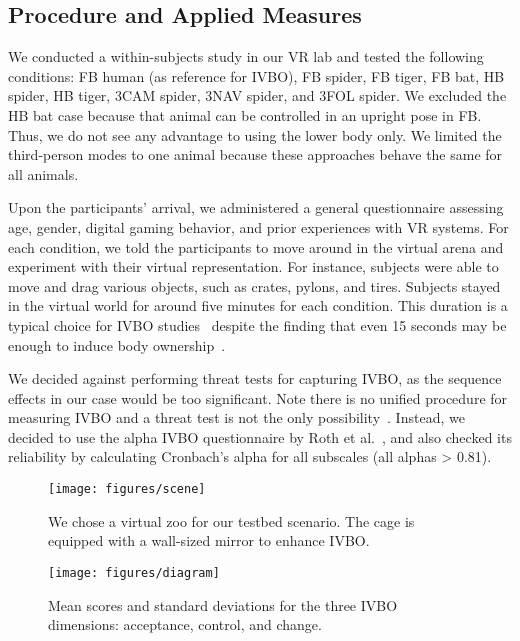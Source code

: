 \subsection{Procedure and Applied Measures}


We conducted a within-subjects study in our VR lab and tested the following conditions: FB human (as reference for IVBO), FB spider, FB tiger, FB bat, HB spider, HB tiger, 3CAM spider, 3NAV spider, and 3FOL spider. We excluded the HB bat case because that animal can be controlled in an upright pose in FB. Thus, we do not see any advantage to using the lower body only. We limited the third-person modes to one animal because these approaches behave the same for all animals.




Upon the participants' arrival, we administered a general questionnaire assessing age, gender, digital gaming behavior, and prior experiences with VR systems. For each condition, we told the participants to move around in the virtual arena and experiment with their virtual representation. For instance, subjects were able to move and drag various objects, such as crates, pylons, and tires. Subjects stayed in the virtual world for around five minutes for each condition. This duration is a typical choice for IVBO studies~\cite{tsakiris2005rubber} despite the finding that even 15 seconds may be enough to induce body ownership~\cite{lloyd2007spatial}. 

We decided against performing threat tests for capturing IVBO, as the sequence effects in our case would be too significant. Note there is no unified procedure for measuring IVBO and a threat test is not the only possibility~\cite{kilteni2012sense,roth2017alpha}. Instead, we decided to use the alpha IVBO questionnaire by Roth et al.~, and also checked its reliability by calculating Cronbach’s alpha for all subscales (all alphas > 0.81).

\begin{figure}[b]
\centering
\texttt{[image: figures/scene]}
\caption{We chose a virtual zoo for our testbed scenario. The cage is equipped with a wall-sized mirror to enhance IVBO.}
\label{fig:scene}
\end{figure}


\begin{figure*}[t!]
\centering
\texttt{[image: figures/diagram]}
\caption{Mean scores and standard deviations for the three IVBO dimensions: acceptance, control, and change.}
\label{fig:diagram}
\end{figure*}

